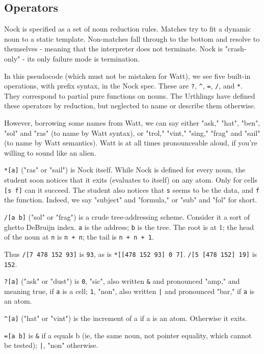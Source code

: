 \documentclass[10pt, nocopyrightspace]{sigplanconf}
\begin{document}
\subsection{Operators}

Nock is specified as a set of noun reduction rules.  Matches try to
fit a dynamic noun to a static template.  Non-matches fall
through to the bottom and resolve to themselves - meaning that
the interpreter does not terminate.  Nock is "crash-only"
\citep{crashonly} -
its only failure mode is termination.

In this pseudocode (which must not be mistaken for Watt), we see five built-in operations, with prefix syntax, in the
Nock spec.  These are \verb|?|, \verb|^|, \verb|=|, \verb|/|,
and \verb|*|.  They correspond to
partial pure functions on nouns.  The Urthlings have defined
these operators by reduction, but neglected to name or describe
them otherwise.

However, borrowing some names from Watt, we can say either
"ask," "hat", "ben", "sol" and "ras" (to name by Watt syntax),
or "trol," "vint," "sing," "frag" and "sail" (to name by Watt
semantics).  Watt is at all times pronounceable aloud, if you're
willing to sound like an alien.

\verb|*[a]| ("ras" or "sail") is Nock itself.  While Nock is defined
for every noun, the student soon notices that it exits
(evaluates to itself) on any atom.  Only for cells \verb|[s f]|
can it succeed.  The student also notices that \verb|s| seems to be the
data, and \verb|f| the function.  Indeed, we say "subject" and
"formula," or "sub" and "fol" for short.

\verb|/[a b]| ("sol" or "frag") is a crude tree-addressing
scheme.  Consider it a sort of ghetto DeBruijn index.
\verb|a| is the address; \verb|b| is the tree.  The root is at 1;
the head of the noun at \verb|n| is \verb|n + n|; the tail is
\verb|n + n + 1|.  

Thus \verb|/[7 478 152 93]| is \verb|93|, as is \verb|*[[478 152 93] 0 7]|.
\verb|/[5 [478 152] 19]| is \verb|152|.

\verb|?[a]| ("ask" or "dust") is \verb|0|, "sic", also written \verb|&| and
pronounced "amp," and meaning true, if \verb|a| is a cell;
\verb|1|, "non",
also written \verb!|! and pronounced "bar," if \verb|a| is an atom.

\verb|^[a]| ("hat" or "vint") is the increment of a if a is an atom.
Otherwise it exits.

\verb|=[a b]| is \verb|&| if a equals b (ie, the same noun, not pointer
equality, which cannot be tested); \verb!|!, "non" otherwise.
\end{document}
